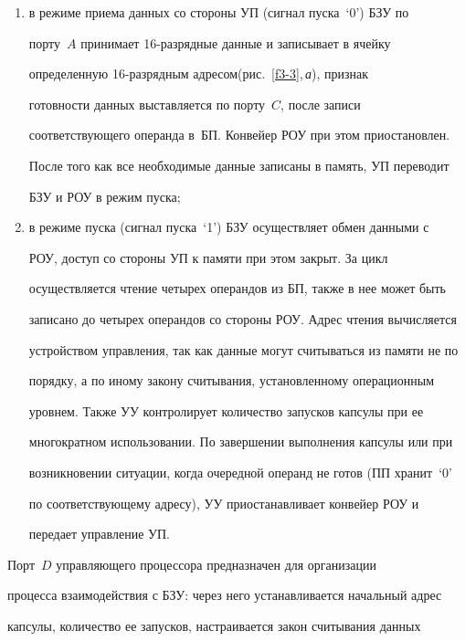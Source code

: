       \begin{enumerate}[(1)]


\item в режиме приема данных со стороны УП (сигнал пуска~`0') БЗУ по 


порту~$A$ принимает 16-раз\-ряд\-ные данные и записывает в ячейку 


определенную 16-раз\-ряд\-ным адресом\linebreak (рис.~\ref{f3-3},\,\textit{а}), признак 


готовности данных выставляется по порту~$C$, после записи 


соответствующего операнда в~БП. Конвейер РОУ при этом приостановлен. 


После того как все необходимые данные записаны в память, УП переводит 


БЗУ и РОУ в режим пуска;


\item в режиме пуска (сигнал пуска~`1') БЗУ осуществляет обмен данными с 


РОУ, доступ со стороны УП к памяти при этом закрыт. За цикл 


осуществляется чтение четырех операндов из БП, также в нее может быть 


записано до четырех операндов со стороны РОУ. Адрес чтения вычисляется 


устройством управления, так как данные могут считываться из памяти не по 


порядку, а по иному закону считывания, установленному операционным 


уровнем. Также УУ контролирует количество запусков капсулы при ее 


многократном использовании. По завершении выполнения капсулы или при 


возникновении ситуации, когда очередной операнд не готов (ПП хранит~`0' 


по соответствующему адресу), УУ приостанавливает конвейер РОУ и 


передает управление УП.


\end{enumerate}





      Порт~$D$ управляющего процессора предназначен для организации 


процесса взаимодействия с БЗУ: через него устанавливается начальный адрес 


капсулы, количество ее запусков, на\-страи\-ва\-ет\-ся закон считывания данных 


